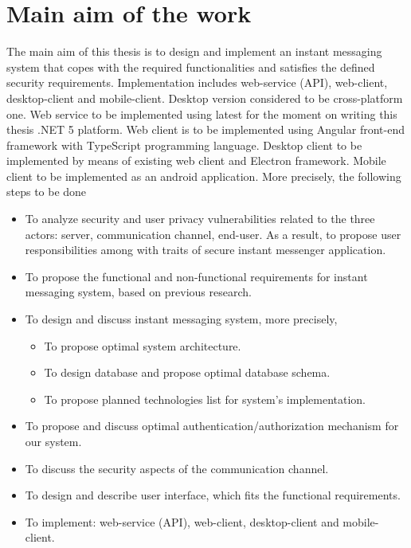 \chapter{Main aim of the work}\label{ch:main-aim-of-the-work}

The main aim of this thesis is to design and implement an instant messaging system
that copes with the required functionalities and satisfies the defined security requirements.
Implementation includes web-service (API), web-client, desktop-client and mobile-client.
Desktop version considered to be cross-platform one.
Web service to be implemented using latest for the moment on writing this thesis .NET 5 platform.
Web client is to be implemented using Angular front-end framework with TypeScript programming language.
Desktop client to be implemented by means of existing web client and Electron framework.
Mobile client to be implemented as an android application.
More precisely, the following steps to be done
\begin{itemize}
    \item To analyze security and user privacy vulnerabilities related to the three
    actors: server, communication channel, end-user.
    As a result, to propose user responsibilities among with traits of secure instant messenger application.
    \item To propose the functional and non-functional requirements for instant messaging system, based on previous
    research.
    \item To design and discuss instant messaging system, more precisely,
    \begin{itemize}
        \item To propose optimal system architecture.
        \item To design database and propose optimal database schema.
        \item To propose planned technologies list for system's implementation.
    \end{itemize}
    \item To propose and discuss optimal authentication/authorization mechanism for our system.
    \item To discuss the security aspects of the communication channel.
    \item To design and describe user interface, which fits the functional requirements.
    \item To implement: web-service (API), web-client, desktop-client and mobile-client.
\end{itemize}